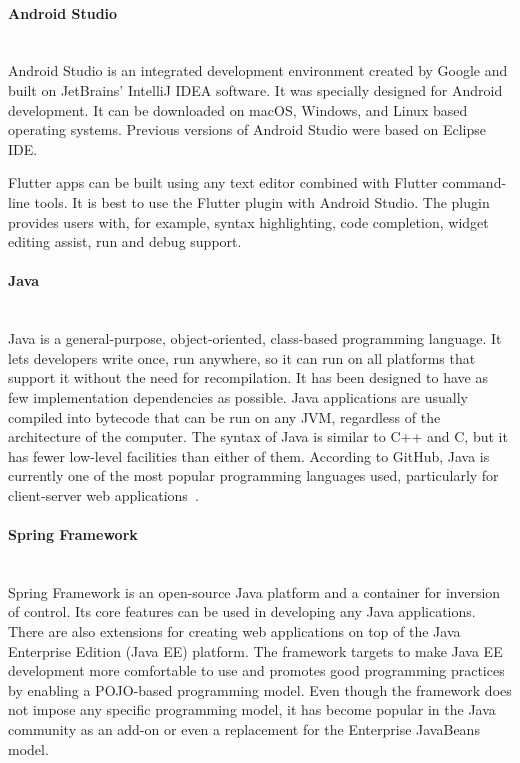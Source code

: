 \paragraph{\large{Android Studio}}\mbox{}\\[2pt]
Android Studio is an integrated development environment created by Google and built on JetBrains' IntelliJ IDEA software. It was specially designed for Android development. It can be downloaded on macOS, Windows, and Linux based operating systems. Previous versions of Android Studio were based on Eclipse IDE.~\cite{android-studio}

Flutter apps can be built using any text editor combined with Flutter command-line tools. It is best to use the Flutter plugin with Android Studio. The plugin provides users with, for example, syntax highlighting, code completion, widget editing assist, run and debug support.

\paragraph{\large{Java}}\mbox{}\\[2pt]
Java is a general-purpose, object-oriented, class-based programming language. It lets developers write once, run anywhere, so it can run on all platforms that support it without the need for recompilation.  It has been designed to have as few implementation dependencies as possible. Java applications are usually compiled into bytecode that can be run on any JVM, regardless of the architecture of the computer. The syntax of Java is similar to C++ and C, but it has fewer low-level facilities than either of them. According to GitHub, Java is currently one of the most popular programming languages used, particularly for client-server web applications~\cite{java}.

\paragraph{\large{Spring Framework}}\mbox{}\\[2pt]
Spring Framework is an open-source Java platform and a container for inversion of control. Its core features can be used in developing any Java applications. There are also extensions for creating web applications on top of the Java Enterprise Edition (Java EE) platform. The framework targets to make Java EE development more comfortable to use and promotes good programming practices by enabling a POJO-based programming model. Even though the framework does not impose any specific programming model, it has become popular in the Java community as an add-on or even a replacement for the Enterprise JavaBeans model.~\cite{spring}

